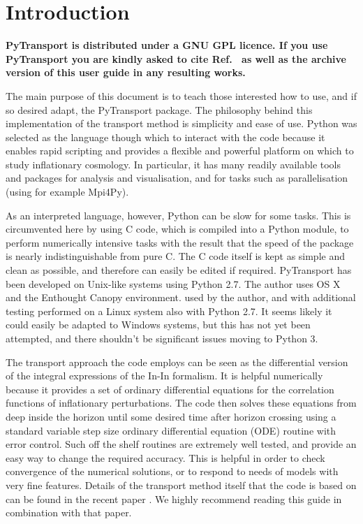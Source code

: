 \documentclass[10pt,
amsmath,amssymb,
aps,prd,nofootinbib,eqsecnum,a4paper]{revtex4}
\newcommand{\CC}{C\nolinebreak\hspace{-.05em}\raisebox{.4ex}{\tiny\bf +}\nolinebreak\hspace{-.10em}\raisebox{.4ex}{\tiny\bf +}}
\def\CC{{C\nolinebreak[4]\hspace{-.05em}\raisebox{.4ex}{\tiny\bf ++}}}
\def\S{ }
\begin{document}
\section{Introduction}

\begin{framed}
{\bf \noindent PyTransport is distributed under a GNU GPL licence. If you use PyTransport you are kindly asked to cite Ref.~\cite{xxx}  as well as the archive version of this user guide in any resulting works. }
\end{framed}

The main purpose of this document is to teach those interested how to use, and if so desired adapt, 
the PyTransport package. 
The philosophy behind this implementation of the transport method is simplicity and ease of use. 
Python was selected as the 
language though which to interact with the code because it enables rapid scripting and provides a flexible 
and powerful platform on which to study inflationary cosmology. In particular, it has many readily available tools and packages for analysis and visualisation, and for tasks such as parallelisation  (using for example Mpi4Py).  

As an interpreted language, however, Python can be slow for some tasks. This is circumvented here by 
using \CC \S  code, 
which is compiled into a Python module, to perform numerically intensive tasks with the result that the speed 
of the package is nearly indistinguishable from pure \CC. The \CC \S  code itself is kept as simple and 
clean as possible, and therefore can easily be edited if required. PyTransport has been developed on 
Unix-like systems 
using Python 2.7. The author uses OS X  and the Enthought Canopy environment. used by the 
author, and with additional testing performed on a Linux system also with Python 2.7. 
It seems likely it could easily be adapted to Windows systems, but this has not yet been attempted,
 and there shouldn't be significant issues moving to Python 3.

The transport approach the code employs 
can be seen as the differential version of the integral expressions of the In-In formalism. It 
is helpful numerically because it provides a set of ordinary differential equations for the correlation functions  
of inflationary perturbations. The code then solves these equations from deep inside the horizon until some desired time 
after horizon crossing using a standard variable step size ordinary differential equation (ODE) 
routine with error control. Such off the shelf 
routines are extremely well tested, and provide
an easy way to change the required accuracy. This is helpful in order to check convergence of the numerical 
solutions, or to respond to needs of models with very fine features. 
Details of the transport method itself that the code is based on can be found in the recent paper \cite{xxx}. We 
highly recommend reading this guide in combination with that paper.
 
\end{document}
